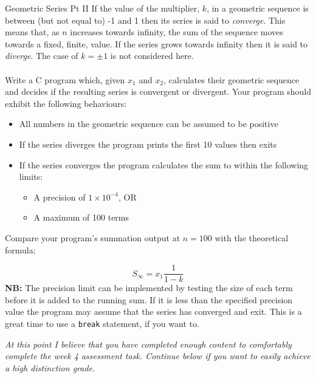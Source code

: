 \documentclass{lab}
\begin{document}
\begin{task}{Geometric Series Pt II}{}
If the value of the multiplier, $k$, in a geometric sequence is between (but not equal to) -1 and 1 then its series is said to \textit{converge}. This means that, as $n$ increases towards infinity, the sum of the sequence moves towards a fixed, finite, value. If the series grows towards infinity then it is said to \textit{diverge}. The case of $k = \pm1$ is not considered here.
\\ \\
Write a C program which, given $x_1$ and $x_2$, calculates their geometric sequence and decides if the resulting series is convergent or divergent. Your program should exhibit the following behaviours: 
\begin{itemize}
\item All numbers in the geometric sequence can be assumed to be positive
\item If the series diverges the program prints the first 10 values then exits
\item If the series converges the program calculates the sum to within the following limits:
	\begin{itemize}
		\item A precision of $1 \times 10^{-4}$, OR
		\item A maximum of 100 terms
	\end{itemize}
\end{itemize}

Compare your program's summation output at $n=100$ with the theoretical formula:

\begin{equation}
S_\infty = x_1 \frac{1}{1-k}
\end{equation}
\textbf{NB:} The precision limit can be implemented by testing the size of each term before it is added to the running sum. If it is less than the specified precision value the program may assume that the series has converged and exit. This is a great time to use a \texttt{break} statement, if you want to.
\end{task}

{\huge\textit{At this point I believe that you have completed enough content to comfortably complete the week 4 assessment task. Continue below if you want to easily achieve a high distinction grade.}}
\end{document}
